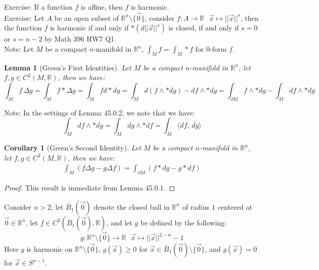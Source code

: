 \documentclass[15pt]{book}
\theoremstyle{break}
\theoremstyle{break}
\newtheorem{lem}{Lemma}[thm]
\newtheorem{corL}{Corollary}[lem]
\newcommand{\R}{\mathbb{R}}
\newcommand{\note}{\color{red}Note: \color{black}}
\newcommand{\exercise}{\color{green}Exercise: \color{black}}
\begin{document}
\exercise If a function $f$ is affine, then $f$ is harmonic.\\

\exercise Let $A$ be an open subset of $\R^n\setminus\{\vec{0}\}$, consider $f:A \to \R \ \ \ \vec{x}\mapsto ||\vec{x}||^s$, then the function $f$ is harmonic if and only if $*(d||\vec{x}||^s)$ is closed, if and only if $s = 0 $ or $s=n-2$ by Math 396 HW7 Q1.\\

\note Let $M$ be a compact $n$-manifold in $\R^n$, $\int_M f = \int_M *f$ for $0$-form $f$.

\begin{lem}[Green's First Identities]
Let $M$ be a compact $n$-manifold in $\R^n$, let $f,g\in C^2(M,\R)$, then we have:
$$\int_M f\,\Delta g = \int_M f*\Delta g = \int_M f d*dg = \int_M d(f\wedge *dg)- df \wedge *dg = \int_{\partial M}f\wedge *dg - \int_M df \wedge * dg $$
\end{lem}
\note In the settings of Lemma 45.0.2, we note that we have: 
$$ \int_M df \wedge * dg =  \int_M dg \wedge * df = \int_M \langle df,\, dg\rangle$$
\begin{corL}[Green's Second Identity]
Let $M$ be a compact $n$-manifold in $\R^n$, let $f,g\in C^2(M,\R)$, then we have:
\begin{align*}
\int_M (f\Delta g- g\Delta f) = \int_{\partial M}(f*dg - g*df)
\end{align*}
\end{corL}
\begin{proof}
This result is immediate from Lemma 45.0.1.
\end{proof}

\hfill\break
Consider $n>2$, let $\bar{B}_1(\vec{0})$ denote the closed ball in $\R^n$ of radius $1$ centered at $\vec{0}\in \R^n$, let $f \in C^2(\bar{B}_1(\vec{0}), \R)$, and let $g$ be defined by the following:
$$g:\R^n\setminus\{\vec{0}\} \to \R \ \ \ \vec{x}\mapsto ||\vec{x}||^{2-n} - 1$$ 
Here $g$ is harmonic on $\R^n \setminus \{ \vec{0}\}$, $g(\vec{x})\geq 0$ for $\vec{x}\in \bar{B}_1(\vec{0}) \setminus \{\vec{0} \}$, and $g(\vec{x}) = 0$ for $\vec{x}\in S^{n-1}$. \\
\end{document}
